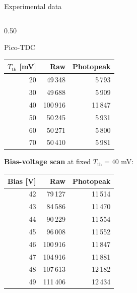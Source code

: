 \begin{frame}{Experimental data}
\begin{columns}[T,totalwidth=\textwidth]
\begin{column}{0.50\textwidth}
\begin{block}{Pico-TDC}
\begin{table}
\centering
\scriptsize
\setlength{\tabcolsep}{4pt}

\begin{tabular}{rrr}
\toprule
\textbf{$T_{\mathrm{th}}$ [mV]} & \textbf{Raw} & \textbf{Photopeak} \\
\midrule
20 & 49\,348 & 5\,793 \\
30 & 49\,688 & 5\,909 \\
40 & 100\,916 & 11\,847 \\
50 & 50\,245 & 5\,931 \\
60 & 50\,271 & 5\,800 \\
70 & 50\,410 & 5\,981 \\
\bottomrule
\end{tabular}

\end{table}


\textbf{Bias-voltage scan} at fixed $T_{\mathrm{th}}=40$ mV:

\vspace{-0.5em}

\begin{table}
\centering
\scriptsize
\setlength{\tabcolsep}{4pt}

\begin{tabular}{rrr}
\toprule
\textbf{Bias [V]} & \textbf{Raw} & \textbf{Photopeak} \\
\midrule
42 & 79\,127 & 11\,514 \\
43 & 84\,586 & 11\,470 \\
44 & 90\,229 & 11\,554 \\
45 & 96\,008 & 11\,552 \\
46 & 100\,916 & 11\,847 \\
47 & 104\,916 & 11\,881 \\
48 & 107\,613 & 12\,182 \\
49 & 111\,406 & 12\,434 \\
\bottomrule
\end{tabular}

\end{table}

\end{block}

\end{column}

\end{columns}

\end{frame}